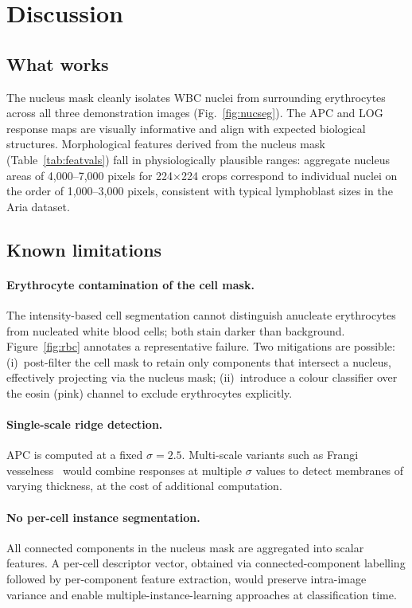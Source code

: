 \documentclass[conference,10pt]{IEEEtran}
\begin{document}
\section{Discussion}
\label{sec:discussion}

\subsection{What works}
The nucleus mask cleanly isolates WBC nuclei from surrounding erythrocytes across all three demonstration images (Fig.~\ref{fig:nucseg}). The APC and LOG response maps are visually informative and align with expected biological structures. Morphological features derived from the nucleus mask (Table~\ref{tab:featvals}) fall in physiologically plausible ranges: aggregate nucleus areas of 4,000--7,000 pixels for 224$\times$224 crops correspond to individual nuclei on the order of 1,000--3,000 pixels, consistent with typical lymphoblast sizes in the Aria dataset.

\subsection{Known limitations}
\paragraph{Erythrocyte contamination of the cell mask.} The intensity-based cell segmentation cannot distinguish anucleate erythrocytes from nucleated white blood cells; both stain darker than background. Figure~\ref{fig:rbc} annotates a representative failure. Two mitigations are possible: (i)~post-filter the cell mask to retain only components that intersect a nucleus, effectively projecting via the nucleus mask; (ii)~introduce a colour classifier over the eosin (pink) channel to exclude erythrocytes explicitly.

\paragraph{Single-scale ridge detection.} APC is computed at a fixed $\sigma = 2.5$. Multi-scale variants such as Frangi vesselness~\cite{frangi1998multiscale} would combine responses at multiple $\sigma$ values to detect membranes of varying thickness, at the cost of additional computation.

\paragraph{No per-cell instance segmentation.} All connected components in the nucleus mask are aggregated into scalar features. A per-cell descriptor vector, obtained via connected-component labelling followed by per-component feature extraction, would preserve intra-image variance and enable multiple-instance-learning approaches at classification time.
\end{document}
